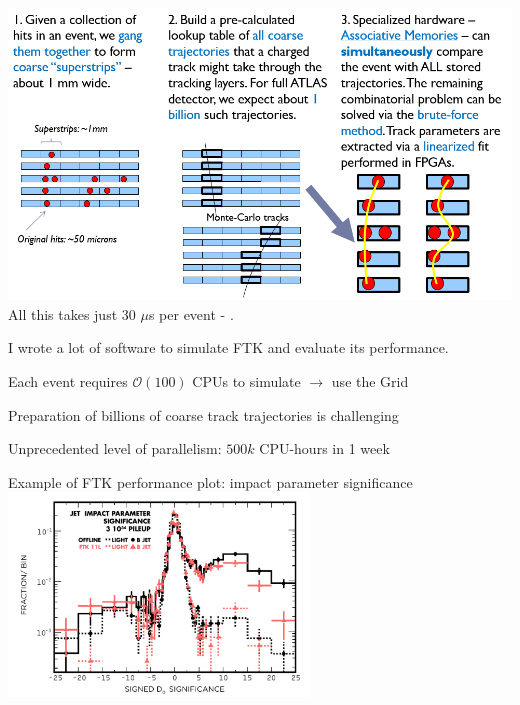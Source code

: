 {
\centering
\includegraphics[width=1.0\textwidth]{dates/mtg/figures/atlas/ftk_principle} \\

All this takes just 30 $\mu$s per event - .

}

{
I wrote a lot of software to simulate FTK and evaluate its performance.
\iteb
\item Each event requires $\mathcal{O}(100)$ CPUs to simulate $\rightarrow$ use the Grid
\item Preparation of billions of coarse track trajectories is challenging
\item Unprecedented level of parallelism: $500k$ CPU-hours in 1 week
\itee

\centering
\tiny{ Example of FTK performance plot: impact parameter significance } \\
\includegraphics[width=0.6\textwidth]{dates/mtg/figures/atlas/d0sig}

}

